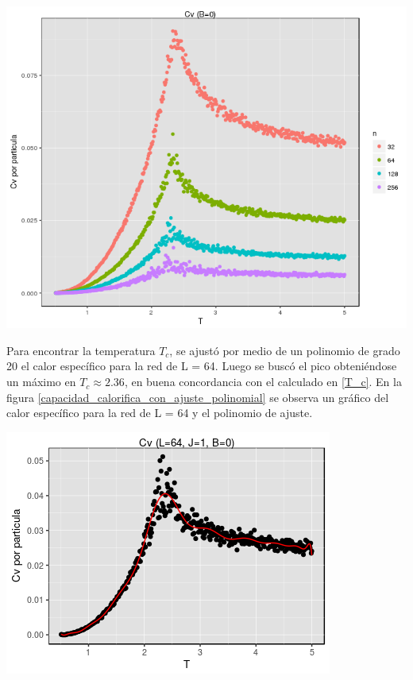 \documentclass[%
 reprint,
 amsmath,amssymb,
 aps,
spanish]{revtex4-1}
\begin{document}
\begin{minipage}{0.45\textwidth}									
\centering
\includegraphics[totalheight=0.25\textheight]{imagenes/con_corona/cv.png}
\label{grafico_capacidad_calorifica}
\end{minipage}

Para encontrar la temperatura $T_c$, se ajustó por medio de un polinomio de grado 20 el calor específico para la red de L = 64. Luego se buscó el pico obteniéndose un máximo en $T_c\approx2.36$, en 
buena concordancia con el calculado en \ref{T_c}. 
En la figura \ref{capacidad_calorifica_con_ajuste_polinomial} se observa un gráfico del calor específico para la red de L = 64 y el polinomio de ajuste.

\begin{minipage}{0.45\textwidth}									
\centering
\includegraphics[totalheight=0.25\textheight]{imagenes/con_corona/ajuste_cv.png}
\label{capacidad_calorifica_con_ajuste_polinomial}
\end{minipage}
\end{document}
